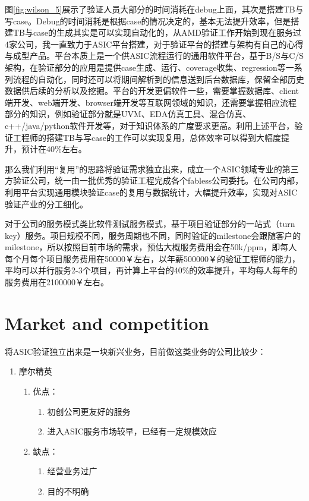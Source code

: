 \documentclass[a4paper,11pt]{article}
\begin{document}
图\ref{fig:wilson_5}展示了验证人员大部分的时间消耗在debug上面，其次是搭建TB与写case。Debug的时间消耗是根据case的情况决定的，基本无法提升效率，但是搭建TB与case的生成其实是可以实现自动化的，从AMD验证工作开始到现在服务过4家公司，我一直致力于ASIC平台搭建，对于验证平台的搭建与架构有自己的心得与成型产品。平台本质上是一个供ASIC流程运行的通用软件平台，基于B/S与C/S架构，在验证部分的应用是提供case生成、运行、coverage收集、regression等一系列流程的自动化，同时还可以将期间解析到的信息送到后台数据库，保留全部历史数据供后续的分析以及挖掘。平台的开发更偏软件一些，需要掌握数据库、client端开发、web端开发、browser端开发等互联网领域的知识，还需要掌握相应流程部分的知识，例如验证部分就是UVM、EDA仿真工具、混合仿真、c++/java/python软件开发等，对于知识体系的广度要求更高。利用上述平台，验证工程师的搭建TB与写case的工作可以实现复用，总体效率可以得到大幅度提升，预计在40\%左右。

那么我们利用“复用”的思路将验证需求独立出来，成立一个ASIC领域专业的第三方验证公司，统一由一批优秀的验证工程完成各个fabless公司委托。在公司内部，利用平台实现通用模块验证case的复用与数据统计，大幅提升效率，实现对ASIC验证产业的分工细化。

对于公司的服务模式类比软件测试服务模式，基于项目验证部分的一站式（turn key）服务。项目规模不同，服务周期也不同，同时验证的milestone会跟随客户的milestone，所以按照目前市场的需求，预估大概服务费用会在50k/ppm，即每人每个月每个项目服务费用在50000￥左右，以年薪500000￥的验证工程师的能力，平均可以并行服务2-3个项目，再计算上平台的40\%的效率提升，平均每人每年的服务费用在2100000￥左右。

\section{Market and competition}
将ASIC验证独立出来是一块新兴业务，目前做这类业务的公司比较少：
\begin{enumerate}
\item 摩尔精英
  \begin{enumerate}
  \item 优点：
    \begin{enumerate}
    \item 初创公司更友好的服务
    \item 进入ASIC服务市场较早，已经有一定规模效应
    \end{enumerate}
  \item 缺点：
    \begin{enumerate}
    \item 经营业务过广
    \item 目的不明确
    \end{enumerate}
  \end{enumerate}
\end{enumerate}
\end{document}

